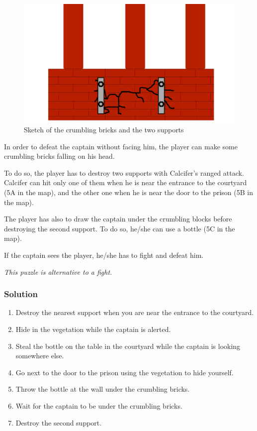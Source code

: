 \begin{figure}[H]
  \centering
  \includegraphics[width=\textwidth]{Images/Puzzles/castleOfDynamia5}
  \caption{Sketch of the crumbling bricks and the two supports}
\end{figure}

In order to defeat the captain without facing him, the player can make some crumbling bricks falling on his head.

To do so, the player has to destroy two supports with Calcifer's ranged attack. Calcifer can hit only one of them when he is near the entrance to the courtyard (5A in the map), and the other one when he is near the door to the prison (5B in the map).

The player has also to draw the captain under the crumbling blocks before destroying the second support. To do so, he/she can use a bottle (5C in the map).

If the captain sees the player, he/she has to fight and defeat him.

\textit{This puzzle is alternative to a fight.}

\subsubsection*{Solution}
\begin{enumerate}
	\item Destroy the nearest support when you are near the entrance to the courtyard.
	\item Hide in the vegetation while the captain is alerted.
	\item Steal the bottle on the table in the courtyard while the captain is looking somewhere else.
	\item Go next to the door to the prison using the vegetation to hide yourself.
	\item Throw the bottle at the wall under the crumbling bricks.
	\item Wait for the captain to be under the crumbling bricks.
	\item Destroy the second support.
\end{enumerate}
